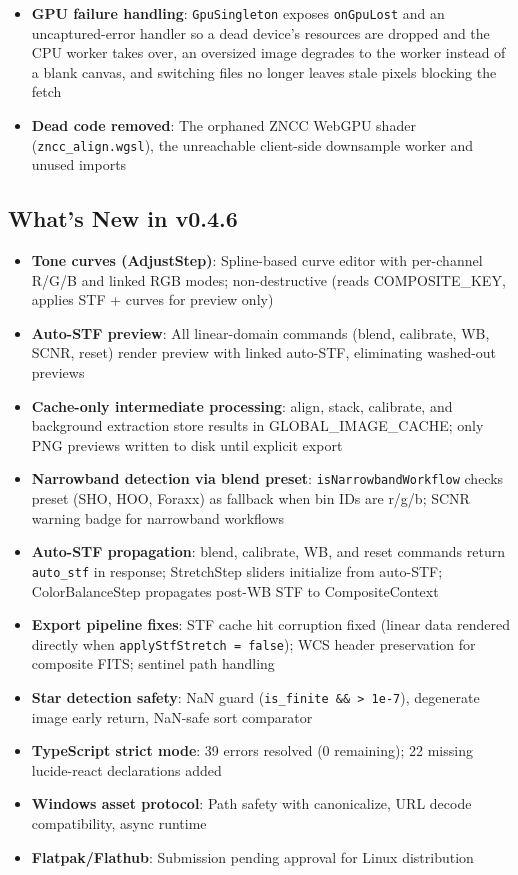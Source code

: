 \documentclass[11pt,a4paper]{article}
\newcommand{\code}[1]{\texttt{\small #1}}
\begin{document}
\begin{itemize}[nosep]
    \item \textbf{GPU failure handling}: \code{GpuSingleton} exposes \code{onGpuLost} and an uncaptured-error handler so a dead device's resources are dropped and the CPU worker takes over, an oversized image degrades to the worker instead of a blank canvas, and switching files no longer leaves stale pixels blocking the fetch
    \item \textbf{Dead code removed}: The orphaned ZNCC WebGPU shader (\code{zncc\_align.wgsl}), the unreachable client-side downsample worker and unused imports
    \end{itemize}

    \subsection{What's New in v0.4.6}
    \begin{itemize}[nosep]
    \item \textbf{Tone curves (AdjustStep)}: Spline-based curve editor with per-channel R/G/B and linked RGB modes; non-destructive (reads COMPOSITE\_KEY, applies STF + curves for preview only)
    \item \textbf{Auto-STF preview}: All linear-domain commands (blend, calibrate, WB, SCNR, reset) render preview with linked auto-STF, eliminating washed-out previews
    \item \textbf{Cache-only intermediate processing}: align, stack, calibrate, and background extraction store results in GLOBAL\_IMAGE\_CACHE; only PNG previews written to disk until explicit export
    \item \textbf{Narrowband detection via blend preset}: \code{isNarrowbandWorkflow} checks preset (SHO, HOO, Foraxx) as fallback when bin IDs are r/g/b; SCNR warning badge for narrowband workflows
    \item \textbf{Auto-STF propagation}: blend, calibrate, WB, and reset commands return \code{auto\_stf} in response; StretchStep sliders initialize from auto-STF; ColorBalanceStep propagates post-WB STF to CompositeContext
    \item \textbf{Export pipeline fixes}: STF cache hit corruption fixed (linear data rendered directly when \code{applyStfStretch = false}); WCS header preservation for composite FITS; sentinel path handling
    \item \textbf{Star detection safety}: NaN guard (\code{is\_finite \&\& > 1e-7}), degenerate image early return, NaN-safe sort comparator
    \item \textbf{TypeScript strict mode}: 39 errors resolved (0 remaining); 22 missing lucide-react declarations added
    \item \textbf{Windows asset protocol}: Path safety with canonicalize, URL decode compatibility, async runtime
    \item \textbf{Flatpak/Flathub}: Submission pending approval for Linux distribution
    \end{itemize}
\end{document}
